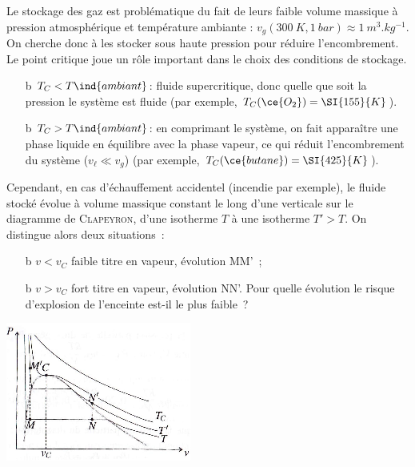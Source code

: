 \documentclass[../../main/main.tex]{subfiles}
\begin{document}
Le stockage des gaz est problématique du fait de leurs faible volume massique à
pression atmosphérique et température ambiante : $v_g(\SI{300}{K}, \SI{1}{bar})
	\approx \SI{1}{m^3.kg^{-1}}$. On cherche donc à les stocker sous haute pression
pour réduire l’encombrement. Le point critique joue un rôle important dans le
choix des conditions de stockage.
\begin{itemize}
	\item[b]{$T_C < T\ind{ambiant}$}: fluide supercritique, donc quelle que soit
	la pression le système est fluide (par exemple, $T_C(\ce{O_2}) =
		\SI{155}{K}$).

	\item[b]{$T_C > T\ind{ambiant}$}: en comprimant le système, on fait apparaître
	une phase liquide en équilibre avec la phase vapeur, ce qui réduit
	l'encombrement du système ($v_{\ell} \ll v_g$) (par exemple, $T_C
		(\ce{butane}) = \SI{425}{K}$).
\end{itemize}

Cependant, en cas d'échauffement accidentel (incendie par exemple), le fluide
stocké évolue à volume massique constant le long d'une verticale sur le
diagramme de \textsc{Clapeyron}, d'une isotherme $T$ à une isotherme $T'>T$. On
distingue alors deux situations~:
\smallbreak
\begin{isd}[righthand ratio=.3]
	\begin{itemize}
		\item[b]{$v < v_C$} faible titre en vapeur, évolution MM'~;
		\item[b]{$v > v_C$} fort titre en vapeur, évolution NN'.
		\olditem[?] Pour quelle évolution le risque d'explosion de l'enceinte est-il le plus
		faible~?
		\olditem[$\Ra$]
	\end{itemize}
	\tcblower
	\begin{center}
		\includegraphics[width=\linewidth]{stock_eau}
	\end{center}
\end{isd}
\end{document}
